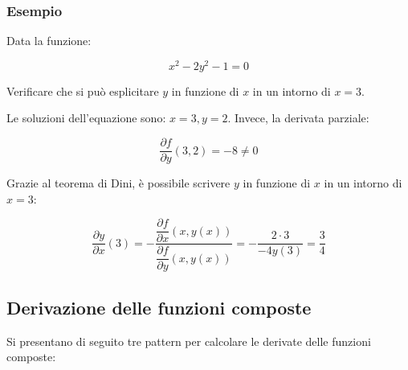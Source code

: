 \documentclass[a4paper]{article}
\begin{document}
	\subsubsection[Esempio]{\textcolor{Green4}{Esempio}}
	
	Data la funzione:
	
	\begin{equation*}
		x^{2} - 2y^{2} - 1 = 0
	\end{equation*}

	\noindent
	Verificare che si può esplicitare $y$ in funzione di $x$ in un intorno di $x = 3$.\newline
	
	\noindent
	Le soluzioni dell'equazione sono: $x = 3, y = 2$. Invece, la derivata parziale:
	
	\begin{equation*}
		\dfrac{\partial f}{\partial y}\left(3,2\right) = -8 \ne 0
	\end{equation*}

	\noindent
	Grazie al teorema di Dini, è possibile scrivere $y$ in funzione di $x$ in un intorno di $x = 3$:
	
	\begin{equation*}
		\dfrac{\partial y}{\partial x}\left(3\right) = - \dfrac{\dfrac{\partial f}{\partial x}\left(x,y\left(x\right)\right)}{\dfrac{\partial f}{\partial y}\left(x, y\left(x\right)\right)} = - \dfrac{2 \cdot 3}{- 4 y \left(3\right)} = \dfrac{3}{4}
	\end{equation*}

	\newpage
	
	\subsection{Derivazione delle funzioni composte}
	
	Si presentano di seguito tre pattern per calcolare le derivate delle funzioni composte:
	
\end{document}
